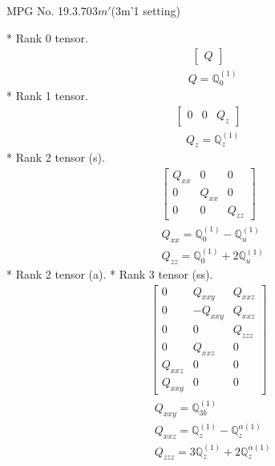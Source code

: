 \documentclass[fleqn,8pt,landscape]{jsarticle}
\begin{document}
\setcounter{MaxMatrixCols}{32}

\renewcommand{\tablename}{Table~}
\renewcommand{\figurename}{Figure~}
\begin{center}
\LARGE
MPG No. 19.3.70\quad$3m'$\quad(3m'1 setting)
\end{center}
* Rank 0 tensor.
\begin{align*}
\begin{bmatrix} Q \end{bmatrix}
\end{align*}
\begin{align*}
& Q = \mathbb{Q}_{0}^{(1)}
\end{align*}
* Rank 1 tensor.
\begin{align*}
\begin{bmatrix} 0 & 0 & Q_{z} \end{bmatrix}
\end{align*}
\begin{align*}
& Q_{z} = \mathbb{Q}_{z}^{(1)}
\end{align*}
* Rank 2 tensor (s).
\begin{align*}
\begin{bmatrix} Q_{xx} & 0 & 0 \\ 0 & Q_{xx} & 0 \\ 0 & 0 & Q_{zz} \end{bmatrix}
\end{align*}
\begin{align*}
& Q_{xx} = \mathbb{Q}_{0}^{(1)} - \mathbb{Q}_{u}^{(1)} \\
& Q_{zz} = \mathbb{Q}_{0}^{(1)} + 2 \mathbb{Q}_{u}^{(1)}
\end{align*}
* Rank 2 tensor (a).
* Rank 3 tensor (ss).
\begin{align*}
\begin{bmatrix} 0 & Q_{xxy} & Q_{xxz} \\ 0 & - Q_{xxy} & Q_{xxz} \\ 0 & 0 & Q_{zzz} \\ 0 & Q_{xxz} & 0 \\ Q_{xxz} & 0 & 0 \\ Q_{xxy} & 0 & 0 \end{bmatrix}
\end{align*}
\begin{align*}
& Q_{xxy} = \mathbb{Q}_{3b}^{(1)} \\
& Q_{xxz} = \mathbb{Q}_{z}^{(1)} - \mathbb{Q}_{z}^{\alpha(1)} \\
& Q_{zzz} = 3 \mathbb{Q}_{z}^{(1)} + 2 \mathbb{Q}_{z}^{\alpha(1)}
\end{align*}
\end{document}
